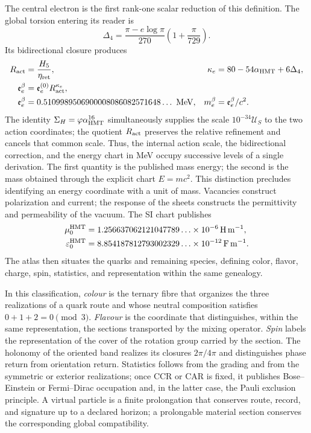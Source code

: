 The central electron is the first rank-one scalar reduction of this
definition. The global torsion entering its reader is
\[
 \Delta_4=\frac{\pi-e\log\pi}{270}
 \left(1+\frac{\pi}{729}\right).
\]
Its bidirectional closure produces
\[
 \begin{aligned}
 R_{\rm act}&=\frac{H_5}{\eta_{\rm ret}},
 &\kappa_e&=80-54\alpha_{\rm HMT}+6\Delta_4,\\
 \mathfrak e_e^\beta&=\mathfrak e_e^{(0)}R_{\rm act}^{\kappa_e},\\
 \mathfrak e_e^\beta
 &=0.5109989506900008086082571648\ldots\ {\rm MeV},
 &m_e^\beta&=\mathfrak e_e^\beta/c^2.
 \end{aligned}
\]
The identity
\(\Sigma_H=\varphi\alpha_{\rm HMT}^{16}\) simultaneously supplies the
scale \(10^{-34}\mathcal U_S\) to the two action coordinates; the
quotient \(R_{\rm act}\) preserves the relative refinement and cancels that
common scale. Thus, the internal action scale, the bidirectional correction, and the
energy chart in MeV occupy successive levels of a single derivation.
The first quantity is the published mass energy; the second is the mass
obtained through the explicit chart $E=mc^2$. This distinction precludes identifying
an energy coordinate with a unit of mass.
Vacancies construct polarization and current; the response of the sheets
constructs the permittivity and permeability of the vacuum. The SI chart publishes
\[
 \begin{aligned}
 \mu_0^{\rm HMT}
 &=1.256637062121047789\ldots\times10^{-6}\,\mathrm{H\,m^{-1}},\\
 \varepsilon_0^{\rm HMT}
 &=8.854187812793002329\ldots\times10^{-12}\,\mathrm{F\,m^{-1}}.
 \end{aligned}
\]
The atlas then situates
the quarks and remaining species, defining color, flavor, charge, spin,
statistics, and representation within the same genealogy.

In this classification, \emph{colour} is the ternary fibre that organizes the
three realizations of a quark route and whose neutral composition satisfies
\(0+1+2=0\pmod3\). \emph{Flavour} is the coordinate that distinguishes, within
the same representation, the sections transported by the mixing
operator. \emph{Spin} labels the representation of the cover of the
rotation group carried by the section. The holonomy of the oriented band
realizes its closures \(2\pi/4\pi\) and distinguishes phase return from orientation
return. Statistics follows from the
grading and from the symmetric or exterior realizations; once CCR or CAR is fixed, it
publishes Bose--Einstein or Fermi--Dirac occupation and, in the latter case, the
Pauli exclusion principle. A virtual particle is a finite prolongation that
conserves route, record, and signature up to a declared horizon; a prolongable
material section conserves the corresponding global compatibility.

